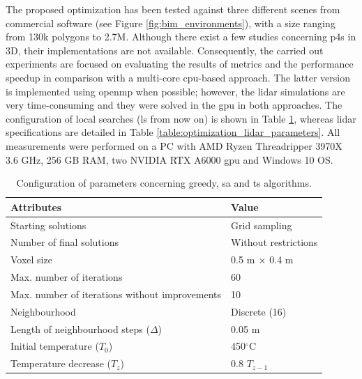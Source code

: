 The proposed optimization has been tested against three different scenes from commercial software (see Figure \ref{fig:bim_environments}), with a size ranging from 130k polygons to 2.7M. Although there exist a few studies concerning \acrshort{p4s} in 3D, their implementations are not available. Consequently, the carried out experiments are focused on evaluating the results of metrics and the performance speedup in comparison with a multi-core \acrshort{cpu}-based approach. The latter version is implemented using \acrshort{openmp} when possible; however, the \acrshort{lidar} simulations are very time-consuming and they were solved in the \acrshort{gpu} in both approaches. The configuration of local searches (\acrshort{ls} from now on) is shown in Table \ref{table:local_search_settings}, whereas \acrshort{lidar} specifications are detailed in Table \ref{table:optimization_lidar_parameters}. All measurements were performed on a PC with AMD Ryzen Threadripper 3970X 3.6 GHz, 256 GB RAM, two NVIDIA RTX A6000 \acrshort{gpu} and Windows 10 OS. 

\renewcommand{\arraystretch}{1.15}
\begin{table}[hb]
\caption{Configuration of parameters concerning greedy, \acrshort{sa} and \acrshort{ts} algorithms.}
\label{table:local_search_settings}
\begin{tabular}{@{}ll@{}}
\toprule
\textbf{Attributes} & \textbf{Value}\\
\midrule
Starting solutions & Grid sampling\\
Number of final solutions & Without restrictions\\
Voxel size & 0.5 \si{\meter} $\times\hspace{1mm}$0.4 \si{\meter}\\
\midrule
Max. number of iterations & 60\\
Max. number of iterations without improvements & 10\\
\midrule
Neighbourhood & Discrete (16)\\
Length of neighbourhood steps ($\Delta$) & 0.05 $\si{\meter}$\\
\midrule
Initial temperature ($T_0$) & 450$^{\circ}$C\\
Temperature decrease ($T_z$) & 0.8 $T_{z-1}$\\
\bottomrule
\end{tabular}
\end{table}
\renewcommand{\arraystretch}{1}

